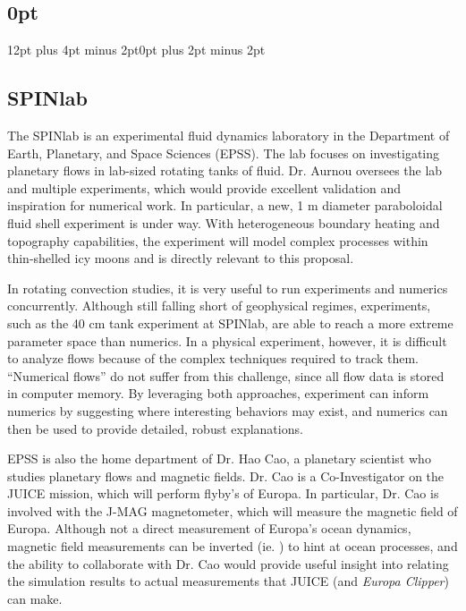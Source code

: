 \documentclass[12pt]{article}
\title{}
\author{}
\date{}
\begin{document}
\pagestyle{fancy}
\thispagestyle{fancy}
\titlespacing\subsection{0pt}{12pt plus 4pt minus 2pt}{0pt plus 2pt minus 2pt}

\fancyhf{} %
\fancyhead[L]{\textcolor{red}{Tobias Oliver\\
		Rationale for University of California Los Angeles\\
Proposed Mentor: Professor Jon Aurnou}}
\fancyfoot[R]{\thepage}
\setlength{\headheight}{25pt}
\subsection*{SPINlab}
The SPINlab is an experimental fluid dynamics laboratory in the Department of Earth, Planetary, and Space Sciences (EPSS). The lab focuses on investigating planetary flows in lab-sized rotating tanks of fluid. Dr. Aurnou oversees the lab and multiple experiments, which would provide excellent validation and inspiration for numerical work. In particular, a new, 1 m diameter paraboloidal fluid shell experiment is under way. With heterogeneous boundary heating and topography capabilities, the experiment will model complex processes within thin-shelled icy moons and is directly relevant to this proposal.

In rotating convection studies, it is very useful to run experiments and numerics concurrently. Although still falling short of geophysical regimes, experiments, such as the 40 cm tank experiment\cite{jA23} at SPINlab, are able to reach a more extreme parameter space than numerics. In a physical experiment, however, it is difficult to analyze flows because of the complex techniques required to track them. ``Numerical flows'' do not suffer from this challenge, since all flow data is stored in computer memory. By leveraging both approaches, experiment can inform numerics by suggesting where interesting behaviors may exist, and numerics can then be used to provide detailed, robust explanations.

EPSS is also the home department of Dr. Hao Cao, a planetary scientist who studies planetary flows and magnetic fields. Dr. Cao is a Co-Investigator on the JUICE mission, which will perform flyby's of Europa. In particular, Dr. Cao is involved with the J-MAG magnetometer, which will measure the magnetic field of Europa.
Although not a direct measurement of Europa's ocean dynamics, magnetic field measurements can be inverted (ie. \cite{nG15}) to hint at ocean processes, and the ability to collaborate with Dr. Cao would provide useful insight into relating the simulation results to actual measurements that JUICE (and \textit{Europa Clipper}) can make.
\end{document}
